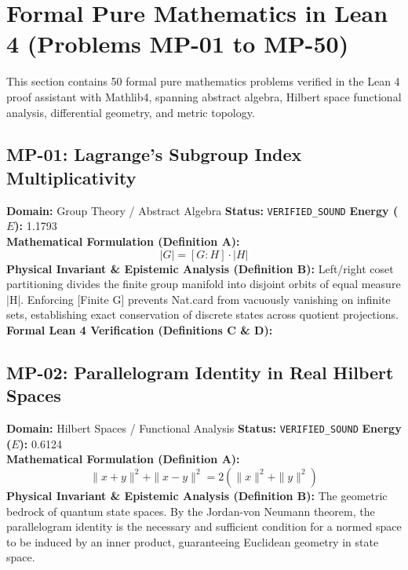 \section{Formal Pure Mathematics in Lean 4 (Problems MP-01 to MP-50)}
This section contains 50 formal pure mathematics problems verified in the Lean 4 proof assistant with Mathlib4, spanning abstract algebra, Hilbert space functional analysis, differential geometry, and metric topology.

\subsection{MP-01: Lagrange's Subgroup Index Multiplicativity}
\textbf{Domain:} Group Theory / Abstract Algebra \hfill \textbf{Status:} \texttt{VERIFIED\_SOUND} \hfill \textbf{Energy ($E$):} 1.1793\\
\textbf{Mathematical Formulation (Definition A):}
\begin{equation*}
|G| = [G : H] \cdot |H|
\end{equation*}
\textbf{Physical Invariant \& Epistemic Analysis (Definition B):}
Left/right coset partitioning divides the finite group manifold into disjoint orbits of equal measure |H|. Enforcing [Finite G] prevents Nat.card from vacuously vanishing on infinite sets, establishing exact conservation of discrete states across quotient projections.\\

\textbf{Formal Lean 4 Verification (Definitions C \& D):}


\vspace{1em}
\subsection{MP-02: Parallelogram Identity in Real Hilbert Spaces}
\textbf{Domain:} Hilbert Spaces / Functional Analysis \hfill \textbf{Status:} \texttt{VERIFIED\_SOUND} \hfill \textbf{Energy ($E$):} 0.6124\\
\textbf{Mathematical Formulation (Definition A):}
\begin{equation*}
\|x + y\|^2 + \|x - y\|^2 = 2(\|x\|^2 + \|y\|^2)
\end{equation*}
\textbf{Physical Invariant \& Epistemic Analysis (Definition B):}
The geometric bedrock of quantum state spaces. By the Jordan-von Neumann theorem, the parallelogram identity is the necessary and sufficient condition for a normed space to be induced by an inner product, guaranteeing Euclidean geometry in state space.\\

